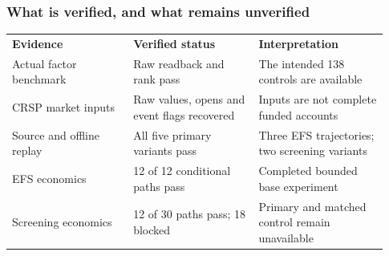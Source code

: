 \documentclass[aspectratio=169,10pt,xcolor=table]{beamer}
\begin{document}
\begin{frame}[t]
\frametitle{What is verified, and what remains unverified}
\relax
{\fontsize{8.2}{10.2}\selectfont\renewcommand{\arraystretch}{1.23}\setlength{\tabcolsep}{4pt}
\begin{tabular}{>{\raggedright\arraybackslash}p{0.3\linewidth}>{\raggedright\arraybackslash}p{0.31\linewidth}>{\raggedright\arraybackslash}p{0.32\linewidth}}
\rowcolor{Navy} \textcolor{Paper}{\textbf{Evidence}} & \textcolor{Paper}{\textbf{Verified status}} & \textcolor{Paper}{\textbf{Interpretation}}\\
\rowcolor{Paper} \textcolor{Ink}{Actual factor benchmark} & \textcolor{Ink}{Raw readback and rank pass} & \textcolor{Ink}{The intended 138 controls are available}\\[2pt]
\rowcolor{Light} \textcolor{Ink}{CRSP market inputs} & \textcolor{Ink}{Raw values, opens and event flags recovered} & \textcolor{Ink}{Inputs are not complete funded accounts}\\[2pt]
\rowcolor{Paper} \textcolor{Ink}{Source and offline replay} & \textcolor{Ink}{All five primary variants pass} & \textcolor{Ink}{Three EFS trajectories; two screening variants}\\[2pt]
\rowcolor{Light} \textcolor{Ink}{EFS economics} & \textcolor{Ink}{12 of 12 conditional paths pass} & \textcolor{Ink}{Completed bounded base experiment}\\[2pt]
\rowcolor{Paper} \textcolor{Ink}{Screening economics} & \textcolor{Ink}{12 of 30 paths pass; 18 blocked} & \textcolor{Ink}{Primary and matched control remain unavailable}\\[2pt]
\end{tabular}
}
\par\vspace{.3cm}
\end{frame}
\end{document}
